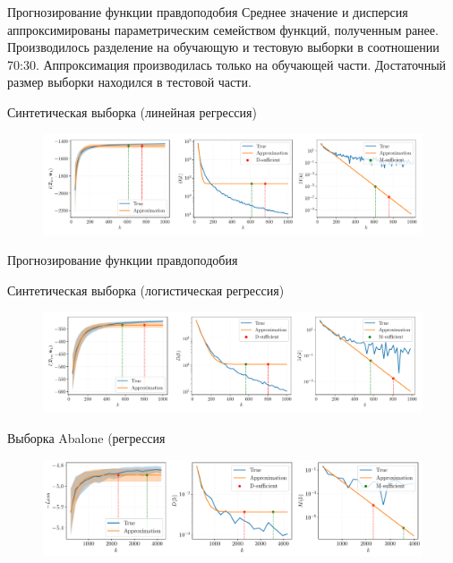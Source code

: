 \documentclass[10pt]{beamer}
\begin{document}
\begin{frame}{Прогнозирование функции правдоподобия}
    Среднее значение и дисперсия аппроксимированы параметрическим семейством функций, полученным ранее. Производилось разделение на обучающую и тестовую выборки в соотношении 70:30. Аппроксимация производилась только на обучающей части. Достаточный размер выборки находился в тестовой части.
    \vfill
    \begin{block}{Синтетическая выборка (линейная регрессия)}
        \begin{figure}[h!]
            \centering
            \includegraphics[width=\textwidth]{paper/figures/synthetic-regression-approximation.pdf}
        \end{figure}
    \end{block}
\end{frame}
\begin{frame}{Прогнозирование функции правдоподобия}
    \begin{block}{Синтетическая выборка (логистическая регрессия)}
        \begin{figure}[h!]
            \centering
            \includegraphics[width=\textwidth]{paper/figures/synthetic-classification-approximation.pdf}
        \end{figure}
    \end{block}
    \vfill
    \begin{block}{Выборка Abalone (регрессия}
        \begin{figure}[h!]
            \centering
            \includegraphics[width=\textwidth]{paper/figures/abalone-approximation.pdf}
        \end{figure}
    \end{block}
\end{frame}
\end{document}
